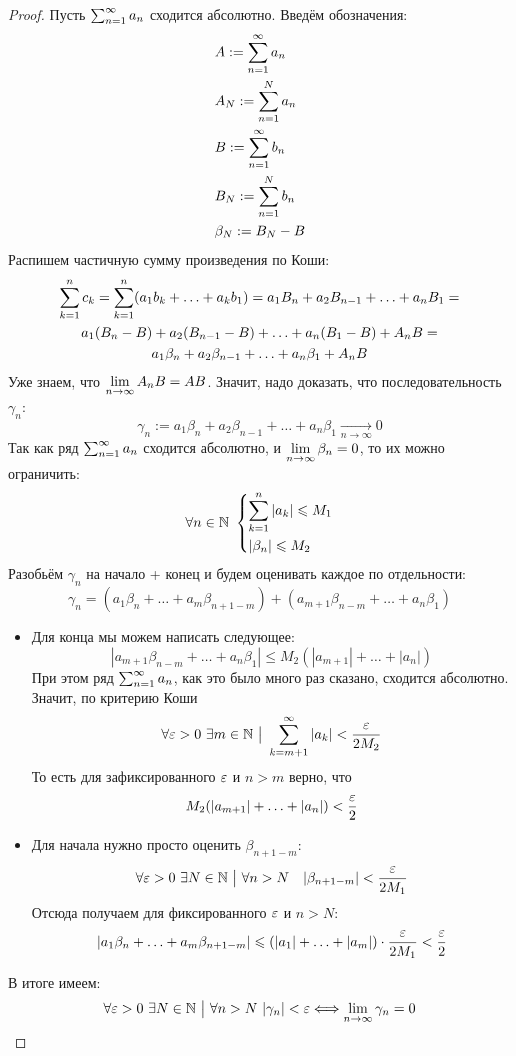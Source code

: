 \begin{proof}
	Пусть $\sum_{n = 1}^\infty a_n$ сходится абсолютно. Введём обозначения:
	\begin{align*}
		&{A := \sum\limits_{n = 1}^\infty a_n}
		\\
		&{A_N := \sum\limits_{n = 1}^N a_n}
		\\
		&{B := \sum\limits_{n = 1}^\infty b_n}
		\\
		&{B_N := \sum\limits_{n = 1}^N b_n}
		\\
		&{\beta_N := B_N - B}
	\end{align*}
	Распишем частичную сумму произведения по Коши:
	\begin{multline*}
		\sum\limits_{k = 1}^n c_k = \sum\limits_{k = 1}^n (a_1 b_k + \ldots + a_k b_1) = a_1 B_n + a_2 B_{n - 1} + \ldots + a_n B_1 =
		\\
		a_1 (B_n - B) + a_2 (B_{n - 1} - B) + \ldots + a_n (B_1 - B) + A_n B =
		\\
		a_1 \beta_n + a_2 \beta_{n - 1} + \ldots + a_n \beta_1 + A_n B
	\end{multline*}
	Уже знаем, что $\lim\limits_{n \to \infty} A_n B = AB$. Значит, надо доказать, что последовательность $\gamma_n$:
	\[
		\gamma_n := a_1 \beta_n + a_2 \beta_{n - 1} + \ldots + a_n \beta_1 \xrightarrow[n \to \infty]{} 0
	\]
	Так как ряд $\sum_{n = 1}^\infty a_n$ сходится абсолютно, и $\lim\limits_{n \to \infty} \beta_n = 0$, то их можно ограничить:
	\[
		\forall n \in \mathbb{N}\ \left\{\begin{aligned}
			&{\sum\limits_{k = 1}^n |a_k| \leqslant M_1}
			\\
			&{|\beta_n| \leqslant M_2}
		\end{aligned}\right.
	\]
	Разобьём $\gamma_n$ на начало + конец и будем оценивать каждое по отдельности:
	\[
		\gamma_n = (a_1 \beta_n + \ldots + a_m \beta_{n + 1 - m}) + (a_{m + 1} \beta_{n - m} + \ldots + a_n \beta_1)
	\]
	\begin{itemize}
		\item Для конца мы можем написать следующее:
		\[
			|a_{m + 1}\beta_{n - m} + \ldots + a_n \beta_1| \le M_2 (|a_{m + 1}| + \ldots + |a_n|)
		\]
		При этом ряд $\sum_{n = 1}^\infty a_n$, как это было много раз сказано, сходится абсолютно. Значит, по критерию Коши
		\[
			\forall \varepsilon > 0\ \exists m \in \mathbb{N} \ \big|\  \sum\limits_{k = m + 1}^\infty |a_k| < \frac{\varepsilon}{2 M_2}
		\]
		То есть для зафиксированного $\varepsilon$ и $n > m$ верно, что
		\[
			M_2(|a_{m + 1}| + \ldots + |a_n|) < \frac{\varepsilon}{2}
		\]
		
		\item Для начала нужно просто оценить $\beta_{n + 1 - m}$:
		\[
			\forall \varepsilon > 0\ \exists N \in \mathbb{N} \ \big|\  \forall n > N \quad |\beta_{n + 1 - m}| < \frac{\varepsilon}{2M_1}
		\]
		Отсюда получаем для фиксированного $\varepsilon$ и $n > N$:
		\[
			|a_1 \beta_n + \ldots + a_m \beta_{n + 1 - m}| \leqslant (|a_1| + \ldots + |a_m|) \cdot \frac{\varepsilon}{2M_1} < \frac{\varepsilon}{2}
		\]
	\end{itemize}
	В итоге имеем:
	\[
		\forall \eps > 0\ \exists N \in \N \such \forall n > N\ |\gamma_n| < \eps \llra \liml_{n \to \infty} \gamma_n = 0
	\]
\end{proof}

